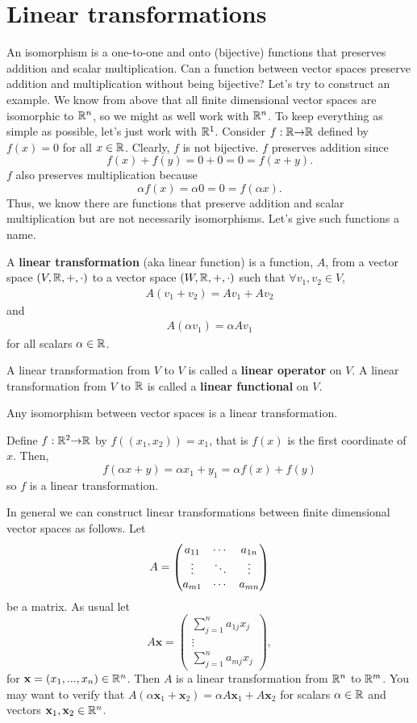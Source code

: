 \section{Linear transformations}

An isomorphism is a one-to-one and onto (bijective) functions that
preserves addition and scalar multiplication. Can a function between
vector spaces preserve addition and multiplication without being
bijective?  Let's try to construct an example. We know from above that
all finite dimensional vector spaces are isomorphic to $\mathbb{R}^n$, so we
might as well work with $\mathbb{R}^n$. To keep everything as simple as
possible, let's just work with $\mathbb{R}^1$. Consider $f:\mathbb{R} {\rightarrow} \mathbb{R}$ defined
by $f(x) = 0$ for all $x \in \mathbb{R}$. Clearly, $f$ is not bijective. $f$
preserves addition since
\[ f(x) + f(y) = 0 + 0 = 0 = f(x+y). \]
$f$ also preserves multiplication because 
\[ \alpha f(x) = \alpha 0 = 0 = f(\alpha x). \]
Thus, we know there are functions that preserve addition and scalar
multiplication but are not necessarily isomorphisms. Let's give such
functions a name. 
\begin{definition}
  A \textbf{linear transformation} (aka linear function) is a
  function, $A$, from a vector space $(V,\mathbb{R},+,\cdot)$ to a vector
  space $(W,\mathbb{R},+,\cdot)$ such that $\forall v_1, v_2 \in V$,
  \begin{align*}
    A (v_1 + v_2) = A v_1 + A v_2 
  \end{align*}
  and 
  \begin{align*}
    A (\alpha v_1) = \alpha A v_1
  \end{align*}
  for all scalars $\alpha \in \mathbb{R}$.   

  A linear transformation from $V$ to $V$ is called a \textbf{linear
    operator} on $V$. A linear transformation from $V$ to $\mathbb{R}$ is
  called a \textbf{linear functional} on $V$.
\end{definition}
Any isomorphism between vector spaces is a linear
transformation. 
\begin{example}
  Define $f: \mathbb{R}^2 {\rightarrow} \mathbb{R}$ by $f( (x_1, x_2) ) = x_1$, that is $f(x)$ is
  the first coordinate of $x$. Then,
  \[ f(\alpha x + y) = \alpha x_1 + y_1 = \alpha f(x) + f(y) \]
  so $f$ is a linear transformation.
\end{example}

In general we can construct linear transformations between finite
dimensional vector spaces as follows. Let 
\[ A = \begin{pmatrix} {a}_{11} & \cdots & {a}_{1n} \\ \vdots & \ddots & \vdots \\ {a}_{m1} & \cdots & {a}_{mn} \end{pmatrix} \]
be a matrix. As usual let 
\[ A\mathbf{x} = 
\begin{pmatrix} 
  \sum_{j=1}^n a_{1j} x_j \\
  \vdots \\
  \sum_{j=1}^n a_{mj} x_j 
\end{pmatrix}, \] for $\mathbf{x} = (x_1, ..., x_n) \in \mathbb{R}^n$. Then
$A$ is a linear transformation from $\mathbb{R}^n$ to $\mathbb{R}^m$. You may want to
verify that $A(\alpha \mathbf{x}_1 + \mathbf{x}_2 ) = \alpha A
\mathbf{x}_1 + A \mathbf{x}_2$ for scalars $\alpha \in \mathbb{R}$ and
vectors $\mathbf{x}_1, \mathbf{x}_2 \in \mathbb{R}^n$. 


